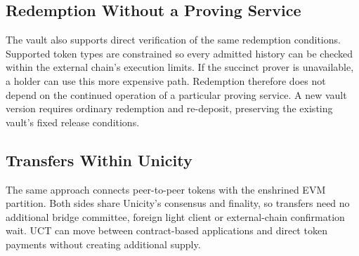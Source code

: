 \subsection{Redemption Without a Proving Service}\label{sec:redemption}

The vault also supports direct verification of the same redemption conditions. Supported token types are constrained so every admitted history can be checked within the external chain's execution limits. If the succinct prover is unavailable, a holder can use this more expensive path. Redemption therefore does not depend on the continued operation of a particular proving service. A new vault version requires ordinary redemption and re-deposit, preserving the existing vault's fixed release conditions.

\subsection{Transfers Within Unicity}

The same approach connects peer-to-peer tokens with the enshrined EVM partition. Both sides share Unicity's consensus and finality, so transfers need no additional bridge committee, foreign light client or external-chain confirmation wait. UCT can move between contract-based applications and direct token payments without creating additional supply.

